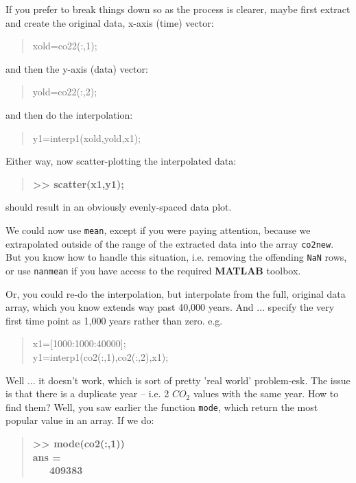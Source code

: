 \documentclass{tufte-book} %
\newenvironment{docspec}{\begin{quotation}\ttfamily\parskip0pt\parindent0pt\ignorespaces}{\end{quotation}}
\newenvironment{docspecbold}{\begin{quotation}\ttfamily\bfseries\parskip0pt\parindent0pt\ignorespaces}{\end{quotation}}
\begin{document}
If you prefer to break things down so as the process is clearer, maybe first extract and create the original data, x-axis (time) vector:
\begin{docspec}
xold=co22(:,1);
\end{docspec}
and then the y-axis (data) vector:
\begin{docspec}
yold=co22(:,2);
\end{docspec}
and then do the interpolation:
\begin{docspec}
y1=interp1(xold,yold,x1);
\end{docspec}

Either way, now scatter-plotting the interpolated data:
\begin{docspecbold}
>> scatter(x1,y1);
\end{docspecbold}

\noindent should result in an obviously evenly-spaced data plot.

We could now use \texttt{mean}, except if you were paying attention, because we extrapolated outside of the range of the extracted data into the array \texttt{co2new}. But you know how to handle this situation, i.e. removing the offending \texttt{NaN} rows, or use \texttt{nanmean} if you have access to the required \textbf{MATLAB} toolbox.

Or, you could re-do the interpolation, but interpolate from the full, original data array, which you know extends way past 40,000 years. And ... specify the very first time point as 1,000 years rather than zero. e.g.
\begin{docspec}
x1=[1000:1000:40000];\\
y1=interp1(co2(:,1),co2(:,2),x1); 
\end{docspec}

Well ... it doesn't work, which is sort of pretty 'real world' problem-esk. The issue is that there is a duplicate year -- i.e. 2 \(CO_{2}\) values with the same year. How to find them? Well, you saw earlier the function \texttt{mode}, which return the most popular value in an array. If we do:
\begin{docspecbold}
>> mode(co2(:,1))\\
ans =\\
\ \ \ 409383
\end{docspecbold}
\end{document}
